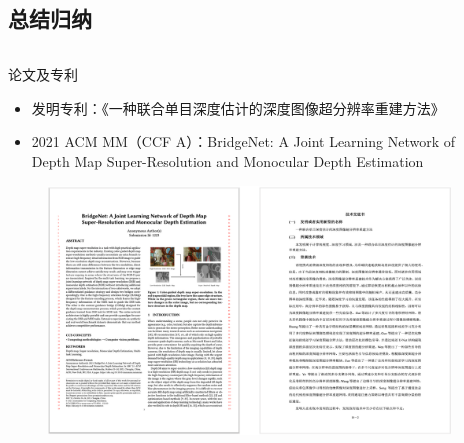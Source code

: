 \documentclass[aspectratio=169,12pt]{beamer}
\begin{document}
\subsection{总结归纳}
\begin{frame}
	\vspace{-0.3cm}
	\begin{columns}
		\begin{column}{0.45\textwidth}
			\begin{block}{\centering\small 论文及专利}
				\begin{itemize}
					\footnotesize
					\item 发明专利：《一种联合单目深度估计的深度图像超分辨率重建方法》
					\item 2021 ACM MM（CCF A）：BridgeNet: A Joint Learning Network of Depth Map Super-Resolution and Monocular Depth Estimation
				\end{itemize}
			\end{block}
			\vspace{-0.3cm}
			\begin{figure}
				\includegraphics[scale=0.45]{25.png}
			\end{figure}

		\end{column}
		\begin{column}{0.45\textwidth}
			
		\end{column}
	
	\end{columns}
	
\end{frame}

\makebackcover
\end{document}
